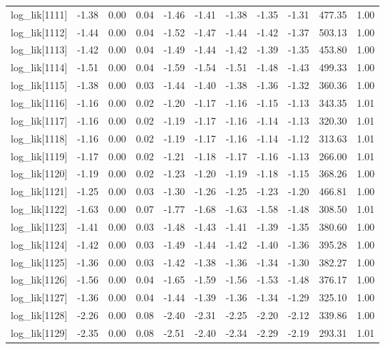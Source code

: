\begin{table}[ht]
\begin{tabular}{rrrrrrrrrrr}
  log\_lik[1111] & -1.38 & 0.00 & 0.04 & -1.46 & -1.41 & -1.38 & -1.35 & -1.31 & 477.35 & 1.00 \\ 
  log\_lik[1112] & -1.44 & 0.00 & 0.04 & -1.52 & -1.47 & -1.44 & -1.42 & -1.37 & 503.13 & 1.00 \\ 
  log\_lik[1113] & -1.42 & 0.00 & 0.04 & -1.49 & -1.44 & -1.42 & -1.39 & -1.35 & 453.80 & 1.00 \\ 
  log\_lik[1114] & -1.51 & 0.00 & 0.04 & -1.59 & -1.54 & -1.51 & -1.48 & -1.43 & 499.33 & 1.00 \\ 
  log\_lik[1115] & -1.38 & 0.00 & 0.03 & -1.44 & -1.40 & -1.38 & -1.36 & -1.32 & 360.36 & 1.00 \\ 
  log\_lik[1116] & -1.16 & 0.00 & 0.02 & -1.20 & -1.17 & -1.16 & -1.15 & -1.13 & 343.35 & 1.01 \\ 
  log\_lik[1117] & -1.16 & 0.00 & 0.02 & -1.19 & -1.17 & -1.16 & -1.14 & -1.13 & 320.30 & 1.01 \\ 
  log\_lik[1118] & -1.16 & 0.00 & 0.02 & -1.19 & -1.17 & -1.16 & -1.14 & -1.12 & 313.63 & 1.01 \\ 
  log\_lik[1119] & -1.17 & 0.00 & 0.02 & -1.21 & -1.18 & -1.17 & -1.16 & -1.13 & 266.00 & 1.01 \\ 
  log\_lik[1120] & -1.19 & 0.00 & 0.02 & -1.23 & -1.20 & -1.19 & -1.18 & -1.15 & 368.26 & 1.00 \\ 
  log\_lik[1121] & -1.25 & 0.00 & 0.03 & -1.30 & -1.26 & -1.25 & -1.23 & -1.20 & 466.81 & 1.00 \\ 
  log\_lik[1122] & -1.63 & 0.00 & 0.07 & -1.77 & -1.68 & -1.63 & -1.58 & -1.48 & 308.50 & 1.01 \\ 
  log\_lik[1123] & -1.41 & 0.00 & 0.03 & -1.48 & -1.43 & -1.41 & -1.39 & -1.35 & 380.60 & 1.00 \\ 
  log\_lik[1124] & -1.42 & 0.00 & 0.03 & -1.49 & -1.44 & -1.42 & -1.40 & -1.36 & 395.28 & 1.00 \\ 
  log\_lik[1125] & -1.36 & 0.00 & 0.03 & -1.42 & -1.38 & -1.36 & -1.34 & -1.30 & 382.27 & 1.00 \\ 
  log\_lik[1126] & -1.56 & 0.00 & 0.04 & -1.65 & -1.59 & -1.56 & -1.53 & -1.48 & 376.17 & 1.00 \\ 
  log\_lik[1127] & -1.36 & 0.00 & 0.04 & -1.44 & -1.39 & -1.36 & -1.34 & -1.29 & 325.10 & 1.00 \\ 
  log\_lik[1128] & -2.26 & 0.00 & 0.08 & -2.40 & -2.31 & -2.25 & -2.20 & -2.12 & 339.86 & 1.00 \\ 
  log\_lik[1129] & -2.35 & 0.00 & 0.08 & -2.51 & -2.40 & -2.34 & -2.29 & -2.19 & 293.31 & 1.01 \\ 

\end{tabular}
\end{table}
